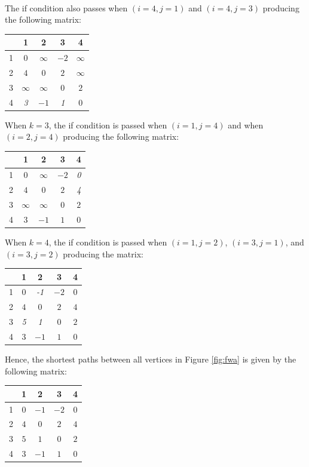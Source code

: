 \documentclass{article}
\begin{document}
\\
The if condition also passes when $(i=4,j=1)$ and $(i=4,j=3)$ producing the following matrix:\\
\begin{tabular}{|c||c|c|c|c|}
\hline
& 1 & 2 & 3 & 4 \\
\hline
\hline
1 & $0$ & $\infty$ & $-2$ & $\infty$ \\
\hline
2 & $4$ & $0$ & $2$ & $\infty$ \\
\hline
3 & $\infty$ & $\infty$ & $0$ & $2$ \\
\hline
4 & \textit{3} & $-1$ & \textit{1} & $0$ \\
\hline
\end{tabular}
\par
When $k=3$, the if condition is passed when $(i=1,j=4)$ and when $(i=2,j=4)$ producing the following matrix:\\
\begin{tabular}{|c||c|c|c|c|}
\hline
& 1 & 2 & 3 & 4 \\
\hline
\hline
1 & $0$ & $\infty$ & $-2$ & \textit{0} \\
\hline
2 & $4$ & $0$ & $2$ & \textit{4} \\
\hline
3 & $\infty$ & $\infty$ & $0$ & $2$ \\
\hline
4 & $3$ & $-1$ & $1$ & $0$ \\
\hline
\end{tabular}
\par
When $k=4$, the if condition is passed when $(i=1,j=2)$, $(i=3,j=1)$, and $(i=3,j=2)$ producing the matrix:\\
\begin{tabular}{|c||c|c|c|c|}
\hline
& 1 & 2 & 3 & 4 \\
\hline
\hline
1 & $0$ & \textit{-1} & $-2$ & $0$ \\
\hline
2 & $4$ & $0$ & $2$ & $4$ \\
\hline
3 & \textit{5} & \textit{1} & $0$ & $2$ \\
\hline
4 & $3$ & $-1$ & $1$ & $0$ \\
\hline
\end{tabular}
\newpage
Hence, the shortest paths between all vertices in Figure \ref{fig:fwa} is given by the following matrix:
\begin{center}
    \begin{tabular}{|c||c|c|c|c|}
    \hline
    & 1 & 2 & 3 & 4 \\
    \hline
    \hline
    1 & $0$ & $-1$ & $-2$ & $0$ \\
    \hline
    2 & $4$ & $0$ & $2$ & $4$ \\
    \hline
    3 & $5$ & $1$ & $0$ & $2$ \\
    \hline
    4 & $3$ & $-1$ & $1$ & $0$ \\
    \hline
    \end{tabular}
\end{center}
\end{document}
